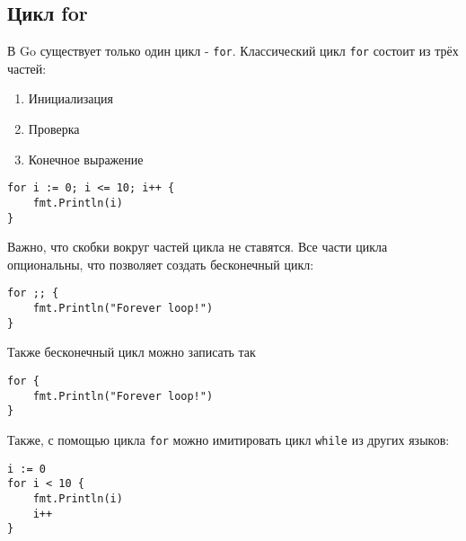 \subsection{Цикл for}
В Go существует только один цикл - \verb|for|.
Классический цикл \verb|for| состоит из трёх частей:
\begin{enumerate}
    \item Инициализация
    \item Проверка
    \item Конечное выражение
\end{enumerate}

\begin{verbatim}
for i := 0; i <= 10; i++ {
    fmt.Println(i)
}
\end{verbatim}

\noindent Важно, что скобки вокруг частей цикла не ставятся.
\noindent Все части цикла опциональны, что позволяет создать бесконечный цикл:
\begin{verbatim}
for ;; {
    fmt.Println("Forever loop!")
}
\end{verbatim}
\noindent Также бесконечный цикл можно записать так
\begin{verbatim}
for {
    fmt.Println("Forever loop!")
}
\end{verbatim}

\noindent Также, с помощью цикла \verb|for| можно имитировать цикл \verb|while| из других языков:
\begin{verbatim}
i := 0
for i < 10 {
    fmt.Println(i)
    i++
}
\end{verbatim}
